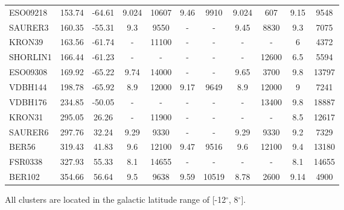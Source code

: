 \documentclass{aa}
\begin{document}
\begin{table}
\begin{tabular}{lcccccccccc}
  ESO09218  & 153.74 & -64.61    & 9.024 & 10607 & 9.46  & 9910  & 9.024 & 607   & 9.15  & 9548  \\
  SAURER3   & 160.35 & -55.31    & 9.3   & 9550  & -   & -   & 9.45  & 8830  & 9.3   & 7075  \\
  KRON39    & 163.56 & -61.74    & -   & 11100 & -   & -   & -   & -   & 6     & 4372  \\
  SHORLIN1  & 166.44 & -61.23    & -   & -   & -   & -   & -   & 12600 & 6.5   & 5594  \\
  ESO09308  & 169.92 & -65.22    & 9.74  & 14000 & -   & -   & 9.65  & 3700  & 9.8   & 13797 \\
  VDBH144   & 198.78 & -65.92    & 8.9   & 12000 & 9.17  & 9649  & 8.9   & 12000 & 9     & 7241  \\
  VDBH176   & 234.85 & -50.05    & -   & -   & -   & -   & -   & 13400 & 9.8   & 18887 \\
  KRON31    & 295.05 & 26.26     & -   & 11900 & -   & -   & -   & -   & 8.5   & 12617 \\
  SAURER6   & 297.76 & 32.24     & 9.29  & 9330  & -   & -   & 9.29  & 9330  & 9.2   & 7329  \\
  BER56     & 319.43 & 41.83     & 9.6   & 12100 & 9.47  & 9516  & 9.6   & 12100 & 9.4   & 13180 \\
  FSR0338   & 327.93 & 55.33     & 8.1   & 14655 & -   & -   & -   & -   & 8.1   & 14655 \\
  BER102    & 354.66 & 56.64     & 9.5   & 9638  & 9.59  & 10519 & 8.78  & 2600  & 9.14  & 4900 \\
  \hline
  \end{tabular}
  \end{table}

  All clusters are located in the galactic latitude range of
  [-12$^{\circ}$, 8$^{\circ}$].
\end{document}
